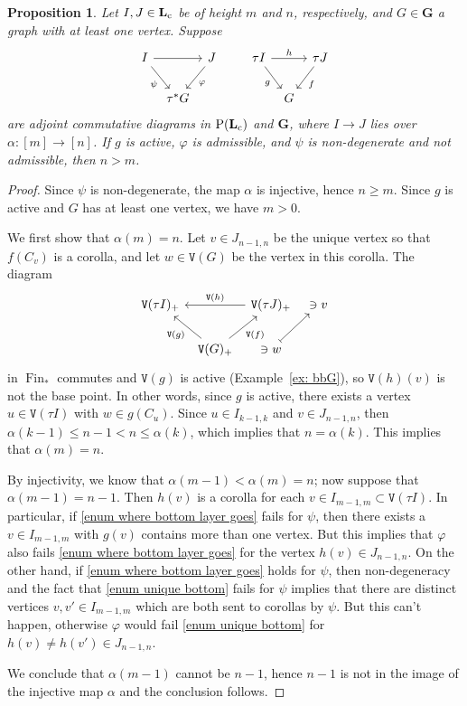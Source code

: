 \documentclass{amsart}
\numberwithin{theorem}{subsection}
\newtheorem{proposition}[theorem]{Proposition}
\theoremstyle{definition}
\newcommand{\finset}{\operatorname{Fin}}
\newcommand{\pfinset}{\finset_*}
\newcommand{\Pre}{\name{P}}
\newcommand{\name}[1]{\ensuremath{\text{\textup{#1}}}}
\newcommand{\levelg}{\mathbf{L}}
\newcommand{\levelgconn}{\levelg_{\name{c}}}
\newcommand{\bbY}{\mathbf{G}}
\newcommand{\vertex}{\mathtt{V}}
\begin{document}
\begin{proposition}\label{proposition about heights and factorizations}
Let $I,J \in \levelgconn$ be of height $m$ and $n$, respectively, and $G\in \bbY$ a graph with at least one vertex.
Suppose 
\[
\begin{tikzcd}[column sep=tiny]
I \arrow[rr] \arrow[dr,"\psi" swap] & & J \arrow[dl,"\varphi"] \\
& \tau^*G
\end{tikzcd}\qquad 
\begin{tikzcd}[column sep=tiny]
\tau I \arrow[rr,"h"] \arrow[dr,"g" swap] & & \tau J \arrow[dl,"f"] \\
& G
\end{tikzcd}
\]
are adjoint commutative diagrams in $\Pre(\levelgconn)$ and $\bbY$, where $I\to J$ lies over $\alpha \colon [m] \to [n]$.
If $g$ is active, $\varphi$ is admissible, and $\psi$ is non-degenerate and not admissible, then $n > m$.
\end{proposition}
\begin{proof}
Since $\psi$ is non-degenerate, the map $\alpha$ is injective, hence $n\geq m$.
Since $g$ is active and $G$ has at least one vertex, we have $m > 0$.

We first show that $\alpha(m) = n$.
Let $v \in J_{n-1,n}$ be the unique vertex so that $f(C_{v})$ is a corolla, and let $w\in \vertex(G)$ be the vertex in this corolla.
The diagram
\[
\begin{tikzcd}[column sep=tiny]
\vertex(\tau I)_+ & & \vertex(\tau J)_+ \arrow[ll,"\vertex(h)" swap] & \ni v \\
& \vertex(G)_+  \arrow[ur,"\vertex(f)" swap]  \arrow[ul,"\vertex(g)"] & \ni w \arrow[ur, mapsto]
\end{tikzcd}
\]
in $\pfinset$ commutes and $\vertex(g)$ is active (Example~\ref{ex: bbG}), so $\vertex(h)(v)$ is not the base point.
In other words, since $g$ is active, there exists a vertex $u \in \vertex(\tau I)$ with $w\in g(C_{u})$.
Since $u\in I_{k-1,k}$ and $v \in J_{n-1,n}$, then $\alpha(k-1) \leq n-1 < n \leq \alpha(k)$, which implies that $n = \alpha(k)$.
This implies that $\alpha(m) = n$.

By injectivity, we know that $\alpha(m-1) < \alpha(m) = n$; now suppose that $\alpha(m-1) = n - 1$. 
Then $h(v)$ is a corolla for each $v\in I_{m-1,m} \subset \vertex(\tau I)$.
In particular, if \eqref{enum where bottom layer goes} fails for $\psi$, then there exists a $v\in I_{m-1,m}$ with $g(v)$ contains more than one vertex.
But this implies that $\varphi$ also fails \eqref{enum where bottom layer goes} for the vertex $h(v) \in J_{n-1,n}$.
On the other hand, if \eqref{enum where bottom layer goes} holds for $\psi$, then non-degeneracy and the fact that \eqref{enum unique bottom} fails for $\psi$ implies that there are distinct vertices $v,v' \in I_{m-1,m}$ which are both sent to corollas by $\psi$.
But this can't happen, otherwise $\varphi$ would fail \eqref{enum unique bottom} for $h(v) \neq h(v') \in J_{n-1,n}$.

We conclude that $\alpha(m-1)$ cannot be $n-1$, hence $n-1$ is not in the image of the injective map $\alpha$ and the conclusion follows.
\end{proof}
\end{document}
